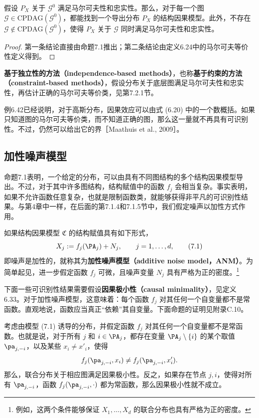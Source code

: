 \begin{lemma}[马尔可夫等价类的可识别性]
假设 $P_X$ 关于 $\mathcal G^0$ 满足马尔可夫性和忠实性。那么，对于每一个图 $\mathcal G\in\mathrm{CPDAG}(\mathcal G^0)$，都能找到一个导出分布 $P_X$ 的结构因果模型。此外，不存在 $\mathcal G\notin\mathrm{CPDAG}(\mathcal G^0)$，使得 $P_X$ 关于 $\mathcal G$ 同时满足马尔可夫性和忠实性。
\end{lemma}
\begin{proof}
第一条结论直接由命题7.1推出；第二条结论由定义6.24中的马尔可夫等价性定义得到。
\end{proof}

\textbf{基于独立性的方法（independence-based methods）}，也称\textbf{基于约束的方法（constraint-based methods）}，假设分布关于底层图满足马尔可夫性和忠实性，再估计正确的马尔可夫等价类，见第7.2.1节。

例6.42已经说明，对于高斯分布，因果效应可以由式 (6.20) 中的一个数概括。如果只知道图的马尔可夫等价类，而不知道正确的图，那么这一量就不再具有可识别性。不过，仍然可以给出它的界［Maathuis et al., 2009］。

\subsection{加性噪声模型}

命题7.1表明，一个给定的分布，可以由具有不同图结构的多个结构因果模型导出。不过，对于其中许多图结构，结构赋值中的函数 $f_j$ 会相当复杂。事实表明，如果不允许函数任意复杂，也就是限制函数类，就能够获得非平凡的可识别性结果。与第4章中一样，在后面的第7.1.4和7.1.5节中，我们假定噪声以加性方式作用。

\begin{definition}[加性噪声模型]
如果结构因果模型 $\mathfrak C$ 的结构赋值具有如下形式，
\begin{equation}
 X_j:=f_j(\PA_j)+N_j,\qquad j=1,\ldots,d,
 \tag{7.1}
\end{equation}
即噪声是加性的，就称其为\textbf{加性噪声模型（additive noise model，ANM）}。为简单起见，进一步假定函数 $f_j$ 可微，且噪声变量 $N_j$ 具有严格为正的密度。\footnote{例如，这两个条件能够保证 $X_1,\ldots,X_d$ 的联合分布也具有严格为正的密度。}
\end{definition}

下面一些可识别性结果需要假设\textbf{因果极小性（causal minimality）}，见定义6.33。对于加性噪声模型，这意味着：每个函数 $f_j$ 对其任何一个自变量都不是常函数。直观地说，函数应当真正“依赖”其自变量。下面命题的证明见附录C.10。

\begin{proposition}[因果极小性与加性噪声模型]
考虑由模型 (7.1) 诱导的分布，并假定函数 $f_j$ 对其任何一个自变量都不是常函数。也就是说，对于所有 $j$ 和 $i\in\PA_j$，都存在变量 $\PA_j\setminus\{i\}$ 的某个取值 $\pa_{j,-i}$，以及某些 $x_i\neq x'_i$，使得
\[
 f_j(\pa_{j,-i},x_i)\neq f_j(\pa_{j,-i},x'_i).
\]
那么，联合分布关于相应图满足因果极小性。反之，如果存在节点 $j,i$，使得对所有 $\pa_{j,-i}$，函数 $f_j(\pa_{j,-i},\cdot)$ 都为常函数，那么因果极小性就不成立。
\end{proposition}

